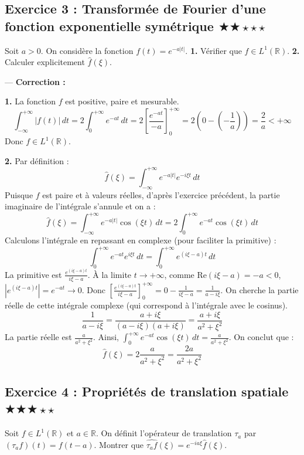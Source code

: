 \documentclass[11pt,a4paper]{article}
\begin{document}
\subsection*{Exercice 3 : Transformée de Fourier d'une fonction exponentielle symétrique \quad $\bigstar\bigstar\star\star\star$}

Soit $a > 0$. On considère la fonction $f(t) = e^{-a|t|}$.
\textbf{1.} Vérifier que $f \in L^1(\mathbb{R})$.
\textbf{2.} Calculer explicitement $\hat{f}(\xi)$.

---
\textbf{Correction :}

\textbf{1.} La fonction $f$ est positive, paire et mesurable.
$$ \int_{-\infty}^{+\infty} |f(t)| \, dt = 2 \int_{0}^{+\infty} e^{-at} \, dt = 2 \left[ \frac{e^{-at}}{-a} \right]_0^{+\infty} = 2 \left( 0 - \left(-\frac{1}{a}\right) \right) = \frac{2}{a} < +\infty $$
Donc $f \in L^1(\mathbb{R})$.

\textbf{2.} Par définition :
$$ \hat{f}(\xi) = \int_{-\infty}^{+\infty} e^{-a|t|} e^{-i\xi t} \, dt $$
Puisque $f$ est paire et à valeurs réelles, d'après l'exercice précédent, la partie imaginaire de l'intégrale s'annule et on a :
$$ \hat{f}(\xi) = \int_{-\infty}^{+\infty} e^{-a|t|} \cos(\xi t) \, dt = 2 \int_{0}^{+\infty} e^{-at} \cos(\xi t) \, dt $$
Calculons l'intégrale en repassant en complexe (pour faciliter la primitive) :
$$ \int_{0}^{+\infty} e^{-at} e^{i\xi t} \, dt = \int_{0}^{+\infty} e^{(i\xi - a)t} \, dt $$
La primitive est $\frac{e^{(i\xi - a)t}}{i\xi - a}$.
À la limite $t \to +\infty$, comme $\text{Re}(i\xi - a) = -a < 0$, $|e^{(i\xi - a)t}| = e^{-at} \to 0$.
Donc $\left[ \frac{e^{(i\xi - a)t}}{i\xi - a} \right]_0^{+\infty} = 0 - \frac{1}{i\xi - a} = \frac{1}{a - i\xi}$.
On cherche la partie réelle de cette intégrale complexe (qui correspond à l'intégrale avec le cosinus).
$$ \frac{1}{a - i\xi} = \frac{a + i\xi}{(a - i\xi)(a + i\xi)} = \frac{a + i\xi}{a^2 + \xi^2} $$
La partie réelle est $\frac{a}{a^2 + \xi^2}$.
Ainsi, $\int_0^{+\infty} e^{-at} \cos(\xi t) \, dt = \frac{a}{a^2 + \xi^2}$.
On conclut que :
$$ \hat{f}(\xi) = 2 \frac{a}{a^2 + \xi^2} = \frac{2a}{a^2 + \xi^2} $$


\subsection*{Exercice 4 : Propriétés de translation spatiale \quad $\bigstar\bigstar\bigstar\star\star$}

Soit $f \in L^1(\mathbb{R})$ et $a \in \mathbb{R}$.
On définit l'opérateur de translation $\tau_a$ par $(\tau_a f)(t) = f(t-a)$.
Montrer que $\widehat{\tau_a f}(\xi) = e^{-ia\xi} \hat{f}(\xi)$.
\end{document}
